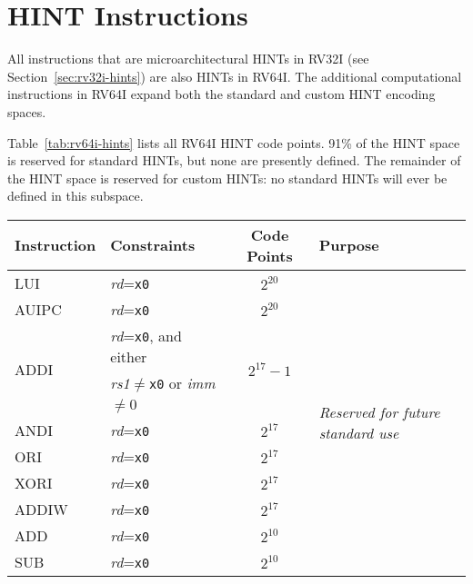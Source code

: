 \section{HINT Instructions}
\label{sec:rv64i-hints}

All instructions that are microarchitectural HINTs in RV32I (see
Section~\ref{sec:rv32i-hints}) are also HINTs in RV64I.  The
additional computational instructions in RV64I expand both the standard and
custom HINT encoding spaces.

Table~\ref{tab:rv64i-hints} lists all RV64I HINT code points.  91\% of the HINT
space is reserved for standard HINTs, but none are presently defined.  The
remainder of the HINT space is reserved for custom HINTs: no standard HINTs
will ever be defined in this subspace.

\begin{table}[hbt]
\centering
\begin{tabular}{|l|l|c|l|}
  \hline
  Instruction           & Constraints                                 & Code Points & Purpose \\ \hline \hline
  LUI                   & {\em rd}={\tt x0}                           & $2^{20}$                    & \multirow{21}{*}{\em Reserved for future standard use} \\ \cline{1-3}
  AUIPC                 & {\em rd}={\tt x0}                           & $2^{20}$                    & \\ \cline{1-3}
  \multirow{2}{*}{ADDI} & {\em rd}={\tt x0}, and either               & \multirow{2}{*}{$2^{17}-1$} & \\
                        & {\em rs1}$\neq${\tt x0} or {\em imm}$\neq$0 &                             & \\ \cline{1-3}
  ANDI                  & {\em rd}={\tt x0}                           & $2^{17}$                    & \\ \cline{1-3}
  ORI                   & {\em rd}={\tt x0}                           & $2^{17}$                    & \\ \cline{1-3}
  XORI                  & {\em rd}={\tt x0}                           & $2^{17}$                    & \\ \cline{1-3}
  ADDIW                 & {\em rd}={\tt x0}                           & $2^{17}$                    & \\ \cline{1-3}
  ADD                   & {\em rd}={\tt x0}                           & $2^{10}$                    & \\ \cline{1-3}
  SUB                   & {\em rd}={\tt x0}                           & $2^{10}$                    & \\ \cline{1-3}

\end{tabular}
\end{table}

